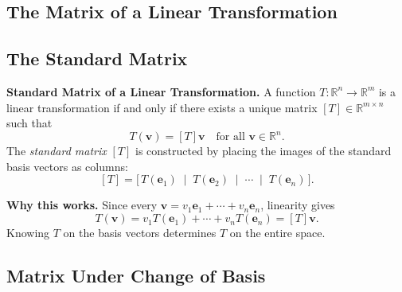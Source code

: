 
\subsection{The Matrix of a Linear Transformation}

\subsection*{The Standard Matrix}

\begin{remark*}[Exposition]
\textbf{Standard Matrix of a Linear Transformation.}
A function $T : \mathbb{R}^n \to \mathbb{R}^m$ is a linear transformation if and only if
there exists a unique matrix $[T] \in \mathbb{R}^{m \times n}$ such that
\[
  T(\mathbf{v}) = [T]\mathbf{v} \quad \text{for all } \mathbf{v} \in \mathbb{R}^n.
\]
The \emph{standard matrix} $[T]$ is constructed by placing the images of
the standard basis vectors as columns:
\[
  [T] = \bigl[\, T(\mathbf{e}_1) \;\mid\; T(\mathbf{e}_2) \;\mid\; \cdots \;\mid\; T(\mathbf{e}_n) \,\bigr].
\]
\end{remark*}

\begin{remark*}[Exposition]
\textbf{Why this works.}
Since every $\mathbf{v} = v_1\mathbf{e}_1 + \cdots + v_n\mathbf{e}_n$,
linearity gives
\[
  T(\mathbf{v}) = v_1 T(\mathbf{e}_1) + \cdots + v_n T(\mathbf{e}_n) = [T]\mathbf{v}.
\]
Knowing $T$ on the basis vectors determines $T$ on the entire space.
\end{remark*}

\subsection*{Matrix Under Change of Basis}

